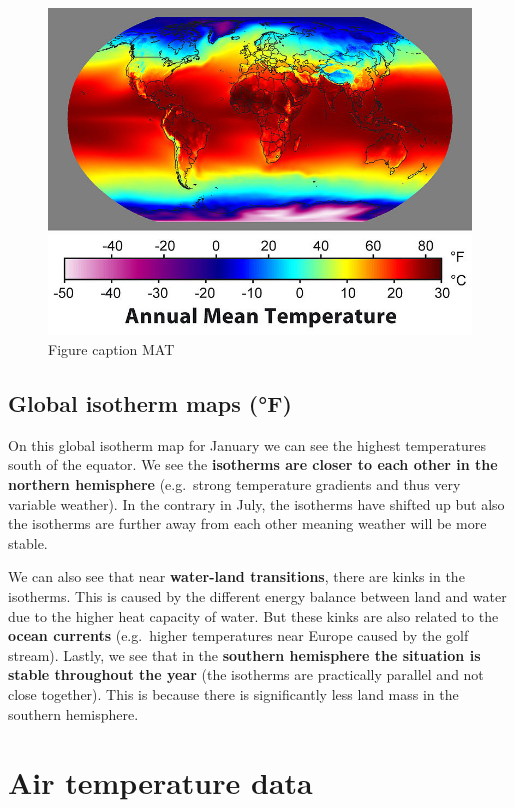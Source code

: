 \documentclass[oneside]{book}
\begin{document}
\begin{figure}
\centering
\includegraphics{figures/FigureMAT.png}
\caption{\label{fig:MAT}Figure caption MAT}
\end{figure}

\subsection{Global isotherm maps (°F)}\label{global-isotherm-maps-f}

On this global isotherm map for January we can see the highest
temperatures south of the equator. We see the \textbf{isotherms are
closer to each other in the northern hemisphere} (e.g.~strong
temperature gradients and thus very variable weather). In the contrary
in July, the isotherms have shifted up but also the isotherms are
further away from each other meaning weather will be more stable.

We can also see that near \textbf{water-land transitions}, there are
kinks in the isotherms. This is caused by the different energy balance
between land and water due to the higher heat capacity of water. But
these kinks are also related to the \textbf{ocean currents} (e.g.~higher
temperatures near Europe caused by the golf stream). Lastly, we see that
in the \textbf{southern hemisphere the situation is stable throughout
the year} (the isotherms are practically parallel and not close
together). This is because there is significantly less land mass in the
southern hemisphere.

\section{Air temperature data}\label{air-temperature-data}
\end{document}
